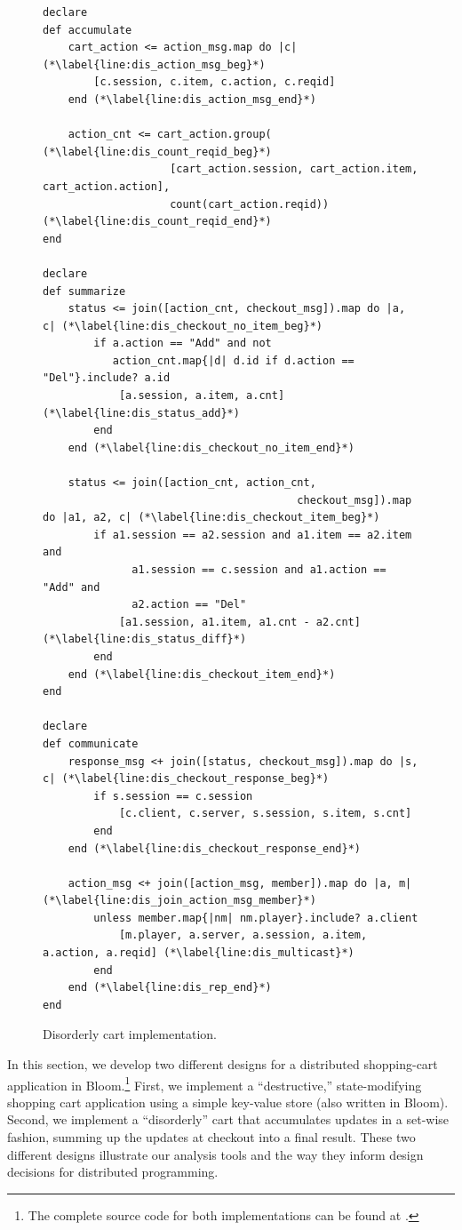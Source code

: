 \begin{figure}[t]
\begin{scriptsize}
\begin{lstlisting}
declare
def accumulate
	cart_action <= action_msg.map do |c| (*\label{line:dis_action_msg_beg}*)
		[c.session, c.item, c.action, c.reqid]
	end (*\label{line:dis_action_msg_end}*)

	action_cnt <= cart_action.group( (*\label{line:dis_count_reqid_beg}*)
					[cart_action.session, cart_action.item, cart_action.action],
					count(cart_action.reqid)) (*\label{line:dis_count_reqid_end}*)
end

declare
def summarize
	status <= join([action_cnt, checkout_msg]).map do |a, c| (*\label{line:dis_checkout_no_item_beg}*)
		if a.action == "Add" and not
		   action_cnt.map{|d| d.id if d.action == "Del"}.include? a.id 
			[a.session, a.item, a.cnt] (*\label{line:dis_status_add}*)
		end 
	end (*\label{line:dis_checkout_no_item_end}*)

	status <= join([action_cnt, action_cnt,
										checkout_msg]).map do |a1, a2, c| (*\label{line:dis_checkout_item_beg}*)
		if a1.session == a2.session and a1.item == a2.item and
			  a1.session == c.session and a1.action == "Add" and
			  a2.action == "Del"
			[a1.session, a1.item, a1.cnt - a2.cnt] (*\label{line:dis_status_diff}*)
		end
	end (*\label{line:dis_checkout_item_end}*)
end

declare 
def communicate
	response_msg <+ join([status, checkout_msg]).map do |s, c| (*\label{line:dis_checkout_response_beg}*)
		if s.session == c.session
			[c.client, c.server, s.session, s.item, s.cnt]
		end
	end (*\label{line:dis_checkout_response_end}*)

	action_msg <+ join([action_msg, member]).map do |a, m| (*\label{line:dis_join_action_msg_member}*)
		unless member.map{|nm| nm.player}.include? a.client
			[m.player, a.server, a.session, a.item, a.action, a.reqid] (*\label{line:dis_multicast}*)
		end 
	end (*\label{line:dis_rep_end}*)
end
\end{lstlisting}
\vspace{-10pt}
\caption{Disorderly cart implementation.}
\label{fig:pdg-disorderly}
\end{scriptsize}
\vspace{-2pt}
\end{figure}



In this section, we develop two different designs for a distributed shopping-cart
application in Bloom.\footnote{The complete source code for 
both implementations can be found at .}
First, we implement a ``destructive,'' state-modifying
shopping cart application using a simple key-value store (also written in Bloom).
Second, we implement a ``disorderly'' cart that accumulates updates in a 
set-wise fashion, summing up the updates at checkout into a final result.  These two different designs illustrate our analysis tools and the way they inform design decisions for distributed programming.  

